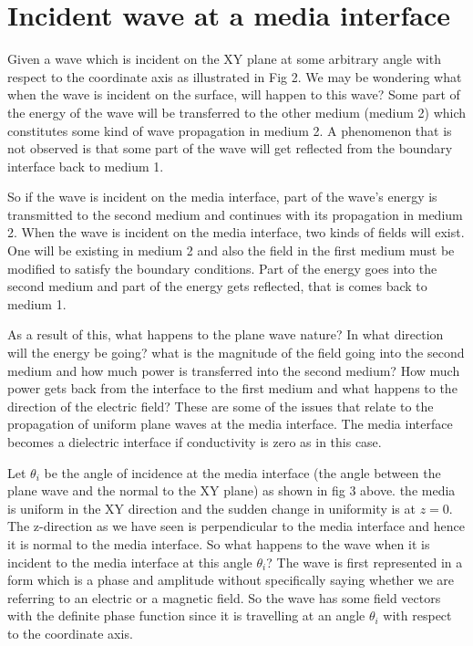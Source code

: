 \section{Incident wave at a media interface}
Given a wave which is incident on the XY plane at some arbitrary angle with respect to the coordinate axis as illustrated in Fig 2. We may be wondering what when the wave is incident on the surface, will happen to this wave? Some part of the energy of the wave will be transferred to the other medium (medium 2) which constitutes some kind of wave propagation in medium 2. A phenomenon that is not observed is that some part of the wave will get reflected from the boundary interface back to medium 1.

So if the wave is incident on the media interface, part of the wave's energy is transmitted to the second medium and continues with its propagation in medium 2. When the wave is incident on the media interface, two kinds of fields will exist. One will be existing in medium 2 and also the field in the first medium must be modified to satisfy the boundary conditions. Part of the energy goes into the second medium and part of the energy gets reflected, that is comes back to medium 1.

As a result of this, what happens to the plane wave nature? In what direction will the energy be going? what is the magnitude of the field going into the second medium and how much power is transferred into the second medium? How much power gets back from the interface to the first medium and what happens to the direction of the electric field? These are some of the issues that relate to the propagation of uniform plane waves at the media interface. The media interface becomes a dielectric interface if conductivity is zero as in this case.

Let $\theta_i$ be the angle of incidence at the media interface (the angle between the plane wave and the normal to the XY plane) as shown in fig 3 above. the media is uniform in the XY direction and the sudden change in uniformity is at $z=0$. The z-direction as we have seen is perpendicular to the media interface and hence it is normal to the media interface. So what happens to the wave when it is incident to the media interface at this angle $\theta_i$? The wave is first represented in a form which is a phase and amplitude without specifically saying whether we are referring to an electric or a magnetic field. So the wave has some field vectors with the definite phase function since it is travelling at an angle $\theta_i$ with respect to the coordinate axis.	

